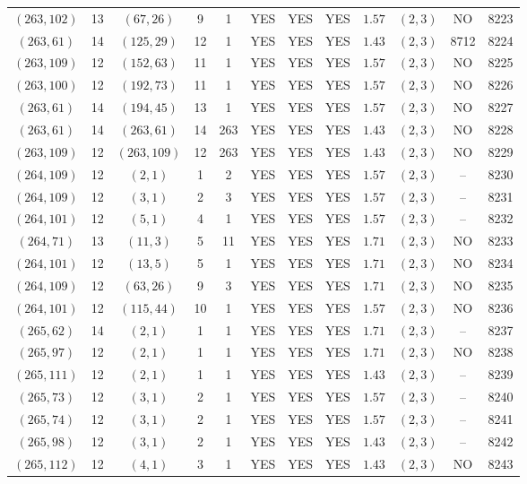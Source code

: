\begin{longtable}{|c|c|c|c|c|c|c|c|c|c|c|c|}
$(263,102)$ & 13 & $(67,26)$ & 9 & 1 & YES & YES & YES & $1.57$ & $(2,3)$ & NO & 8223\\
$(263,61)$ & 14 & $(125,29)$ & 12 & 1 & YES & YES & YES & $1.43$ & $(2,3)$ & 8712 & 8224\\
$(263,109)$ & 12 & $(152,63)$ & 11 & 1 & YES & YES & YES & $1.57$ & $(2,3)$ & NO & 8225\\
$(263,100)$ & 12 & $(192,73)$ & 11 & 1 & YES & YES & YES & $1.57$ & $(2,3)$ & NO & 8226\\
$(263,61)$ & 14 & $(194,45)$ & 13 & 1 & YES & YES & YES & $1.57$ & $(2,3)$ & NO & 8227\\
$(263,61)$ & 14 & $(263,61)$ & 14 & 263 & YES & YES & YES & $1.43$ & $(2,3)$ & NO & 8228\\
$(263,109)$ & 12 & $(263,109)$ & 12 & 263 & YES & YES & YES & $1.43$ & $(2,3)$ & NO & 8229\\
$(264,109)$ & 12 & $(2,1)$ & 1 & 2 & YES & YES & YES & $1.57$ & $(2,3)$ & -- & 8230\\
$(264,109)$ & 12 & $(3,1)$ & 2 & 3 & YES & YES & YES & $1.57$ & $(2,3)$ & -- & 8231\\
$(264,101)$ & 12 & $(5,1)$ & 4 & 1 & YES & YES & YES & $1.57$ & $(2,3)$ & -- & 8232\\
$(264,71)$ & 13 & $(11,3)$ & 5 & 11 & YES & YES & YES & $1.71$ & $(2,3)$ & NO & 8233\\
$(264,101)$ & 12 & $(13,5)$ & 5 & 1 & YES & YES & YES & $1.71$ & $(2,3)$ & NO & 8234\\
$(264,109)$ & 12 & $(63,26)$ & 9 & 3 & YES & YES & YES & $1.71$ & $(2,3)$ & NO & 8235\\
$(264,101)$ & 12 & $(115,44)$ & 10 & 1 & YES & YES & YES & $1.57$ & $(2,3)$ & NO & 8236\\
$(265,62)$ & 14 & $(2,1)$ & 1 & 1 & YES & YES & YES & $1.71$ & $(2,3)$ & -- & 8237\\
$(265,97)$ & 12 & $(2,1)$ & 1 & 1 & YES & YES & YES & $1.71$ & $(2,3)$ & NO & 8238\\
$(265,111)$ & 12 & $(2,1)$ & 1 & 1 & YES & YES & YES & $1.43$ & $(2,3)$ & -- & 8239\\
$(265,73)$ & 12 & $(3,1)$ & 2 & 1 & YES & YES & YES & $1.57$ & $(2,3)$ & -- & 8240\\
$(265,74)$ & 12 & $(3,1)$ & 2 & 1 & YES & YES & YES & $1.57$ & $(2,3)$ & -- & 8241\\
$(265,98)$ & 12 & $(3,1)$ & 2 & 1 & YES & YES & YES & $1.43$ & $(2,3)$ & -- & 8242\\
$(265,112)$ & 12 & $(4,1)$ & 3 & 1 & YES & YES & YES & $1.43$ & $(2,3)$ & NO & 8243\\

\end{longtable}
